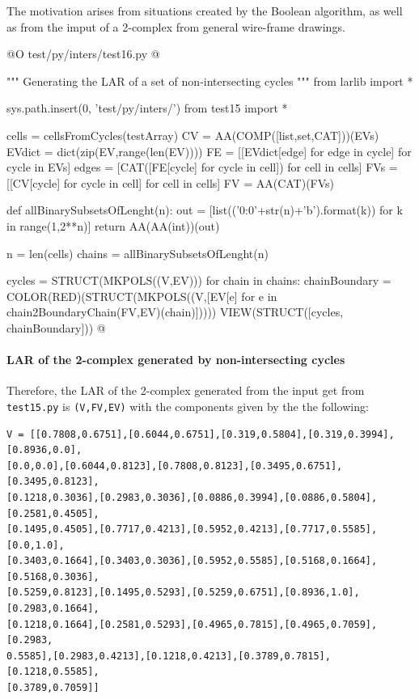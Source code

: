 \documentclass[11pt,oneside]{article}    %
\begin{document}
The motivation arises from situations created by the Boolean algorithm, as well as from the imput of a 2-complex from general wire-frame drawings.

@O test/py/inters/test16.py
@{""" Generating the LAR of a set of non-intersecting cycles """
from larlib import *

sys.path.insert(0, 'test/py/inters/')
from test15 import *

cells = cellsFromCycles(testArray)
CV = AA(COMP([list,set,CAT]))(EVs)
EVdict = dict(zip(EV,range(len(EV))))
FE = [[EVdict[edge] for edge in cycle] for cycle in EVs] 
edges = [CAT([FE[cycle] for cycle in cell]) for cell in cells]
FVs = [[CV[cycle] for cycle in cell] for cell in cells]
FV = AA(CAT)(FVs)

def allBinarySubsetsOfLenght(n):
	out = [list(('{0:0'+str(n)+'b}').format(k)) for k in range(1,2**n)]
	return AA(AA(int))(out)

n = len(cells)
chains = allBinarySubsetsOfLenght(n)

cycles = STRUCT(MKPOLS((V,EV)))
for chain in chains:
    chainBoundary = COLOR(RED)(STRUCT(MKPOLS((V,[EV[e] 
                        for e in chain2BoundaryChain(FV,EV)(chain)]))))
    VIEW(STRUCT([cycles, chainBoundary]))
@}


\paragraph{LAR of the 2-complex generated by non-intersecting cycles}

Therefore, the LAR of the 2-complex generated from the input get from \texttt{test15.py}
is \texttt{(V,FV,EV)} with the components given by the the following:

\begin{verbatim}
V = [[0.7808,0.6751],[0.6044,0.6751],[0.319,0.5804],[0.319,0.3994],[0.8936,0.0],
[0.0,0.0],[0.6044,0.8123],[0.7808,0.8123],[0.3495,0.6751],[0.3495,0.8123],
[0.1218,0.3036],[0.2983,0.3036],[0.0886,0.3994],[0.0886,0.5804],[0.2581,0.4505],
[0.1495,0.4505],[0.7717,0.4213],[0.5952,0.4213],[0.7717,0.5585],[0.0,1.0],
[0.3403,0.1664],[0.3403,0.3036],[0.5952,0.5585],[0.5168,0.1664],[0.5168,0.3036],
[0.5259,0.8123],[0.1495,0.5293],[0.5259,0.6751],[0.8936,1.0],[0.2983,0.1664],
[0.1218,0.1664],[0.2581,0.5293],[0.4965,0.7815],[0.4965,0.7059],[0.2983,
0.5585],[0.2983,0.4213],[0.1218,0.4213],[0.3789,0.7815],[0.1218,0.5585],
[0.3789,0.7059]]
\end{verbatim}
\end{document}
